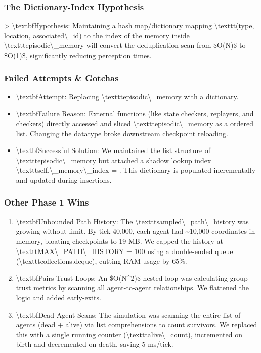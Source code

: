 \documentclass[11pt,a4paper]{article}
\begin{document}
\subsubsection*{The Dictionary-Index Hypothesis}
\textgreater{} \textbackslash{}textbf{Hypothesis:} Maintaining a hash map/dictionary mapping \textbackslash{}texttt{(type, location, associated\textbackslash{}\_id)} to the index of the memory inside \textbackslash{}texttt{episodic\textbackslash{}\_memory} will convert the deduplication scan from \$O(N)\$ to \$O(1)\$, significantly reducing perception times.

\subsubsection*{Failed Attempts \& Gotchas}
\begin{itemize}
  \item \textbackslash{}textbf{Attempt:} Replacing \textbackslash{}texttt{episodic\textbackslash{}\_memory} with a dictionary.
  \item \textbackslash{}textbf{Failure Reason:} External functions (like state checkers, replayers, and checkers) directly accessed and sliced \textbackslash{}texttt{episodic\textbackslash{}\_memory} as a ordered list. Changing the datatype broke downstream checkpoint reloading.
  \item \textbackslash{}textbf{Successful Solution:} We maintained the list structure of \textbackslash{}texttt{episodic\textbackslash{}\_memory} but attached a shadow lookup index \textbackslash{}texttt{self.\textbackslash{}\_memory\textbackslash{}\_index = {}}. This dictionary is populated incrementally and updated during insertions.
\end{itemize}

\subsubsection*{Other Phase 1 Wins}
\begin{enumerate}
  \item \textbackslash{}textbf{Unbounded Path History:} The \textbackslash{}texttt{sampled\textbackslash{}\_path\textbackslash{}\_history} was growing without limit. By tick 40,000, each agent had \textasciitilde{}10,000 coordinates in memory, bloating checkpoints to 19 MB. We capped the history at \textbackslash{}texttt{MAX\textbackslash{}\_PATH\textbackslash{}\_HISTORY = 100} using a double-ended queue (\textbackslash{}texttt{collections.deque}), cutting RAM usage by 65\%.
  \item \textbackslash{}textbf{Pairs-Trust Loops:} An \$O(N\^{}2)\$ nested loop was calculating group trust metrics by scanning all agent-to-agent relationships. We flattened the logic and added early-exits.
  \item \textbackslash{}textbf{Dead Agent Scans:} The simulation was scanning the entire list of agents (dead + alive) via list comprehensions to count survivors. We replaced this with a single running counter (\textbackslash{}texttt{alive\textbackslash{}\_count}), incremented on birth and decremented on death, saving 5 ms/tick.
\end{enumerate}
\end{document}
